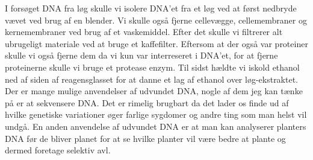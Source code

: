 I forsøget DNA fra løg skulle vi isolere DNA'et fra et løg ved at først nedbryde vævet ved brug af en blender. Vi skulle også fjerne cellevægge, cellemembraner og kernemembraner ved brug af et vaskemiddel. Efter det skulle vi filtrerer alt ubrugeligt materiale ved at bruge et kaffefilter. Eftersom at der også var proteiner skulle vi også fjerne dem da vi kun var interreseret i DNA'et, for at fjerne proteinerne skulle vi bruge et protease enzym. Til sidst hældte vi iskold ethanol ned af siden af reagensglasset for at danne et lag af ethanol over løg-ekstraktet. 
Der er mange mulige anvendelser af udvundet DNA, nogle af dem jeg kan tænke på er at sekvensere DNA. Det er rimelig brugbart da det lader os finde ud af hvilke genetiske variationer øger farlige sygdomer og andre ting som man helst vil undgå. En anden anvendelse af udvundet DNA er at man kan analyserer planters DNA før de bliver planet for at se hvilke planter vil være bedre at plante og dermed foretage selektiv avl.
